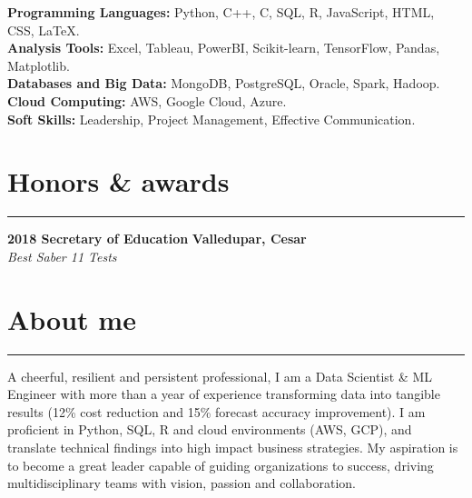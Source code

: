 \documentclass[9pt,a4paper]{article}
\newcommand{\cvevent}[4]{%
  {\noindent \textbf{#1 #2} \hfill \textbf{#3}\\%
   \textit{#4}\\[0pt]}%
}
\begin{document}
\textbf{Programming Languages:} Python, C++, C, SQL, R, JavaScript, HTML, CSS, LaTeX.\\
\textbf{Analysis Tools:} Excel, Tableau, PowerBI, Scikit-learn, TensorFlow, Pandas, Matplotlib.\\
\textbf{Databases and Big Data:} MongoDB, PostgreSQL, Oracle, Spark, Hadoop.\\
\textbf{Cloud Computing:} AWS, Google Cloud, Azure.\\
\textbf{Soft Skills:} Leadership, Project Management, Effective Communication.
\vspace{-\baselineskip}
\section*{Honors \& awards}
\vspace{-\baselineskip}
\noindent\rule{\linewidth}{0.5pt}

\cvevent{2018}{Secretary of Education}{Valledupar, Cesar}{Best Saber 11 Tests}
\vspace{-\baselineskip}
\vspace{-\baselineskip}

\section*{About me}
\vspace{-\baselineskip}
\noindent\rule{\linewidth}{0.5pt}
A cheerful, resilient and persistent professional, I am a Data Scientist \& ML Engineer with more than a year of experience transforming data into tangible results (12\% cost reduction and 15\% forecast accuracy improvement). I am proficient in Python, SQL, R and cloud environments (AWS, GCP), and translate technical findings into high impact business strategies. My aspiration is to become a great leader capable of guiding organizations to success, driving multidisciplinary teams with vision, passion and collaboration.
\end{document}
